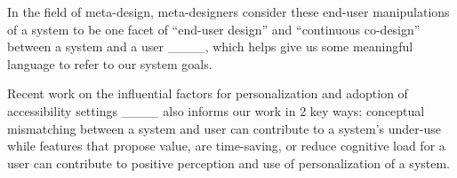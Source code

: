 In the field of meta-design, meta-designers consider these end-user manipulations of a system to be one facet of ``end-user design'' and ``continuous co-design'' between a system and a user ____, which helps give us some meaningful language to refer to our system goals.

Recent work on the influential factors for personalization and adoption of accessibility settings ____ also informs our work in 2 key ways: conceptual mismatching between a system and user can contribute to a system's under-use while features that propose value, are time-saving, or reduce cognitive load for a user can contribute to positive perception and use of personalization of a system.